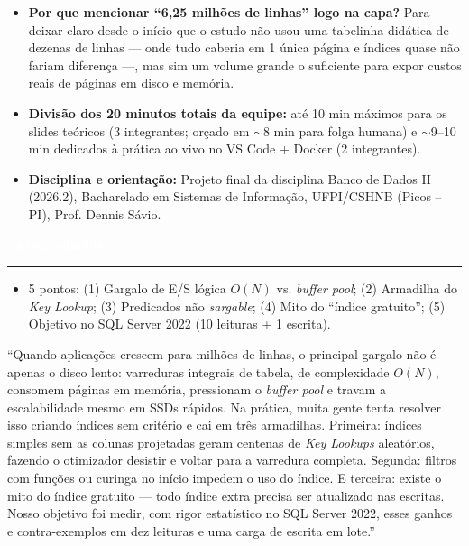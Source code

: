 \documentclass[10pt,a4paper]{article}
\newcommand{\tagTime}[1]{\colorbox{BrandDark}{\textcolor{white}{\textbf{\footnotesize\ #1\ }}}}
\newcommand{\slideHeader}[3]{%
  \noindent{\Large\bfseries\color{BrandDark} Slide #1 — #2}\hfill\tagTime{Alvo: #3}\par
  \vspace{2pt}\noindent\textcolor{BrandAmber}{\rule{\linewidth}{1.3pt}}\par
  \vspace{4pt}
}
\begin{document}
\begin{expBox}
  \begin{itemize}[leftmargin=14pt,itemsep=2pt,topsep=1pt]
    \item \textbf{Por que mencionar ``6,25 milhões de linhas'' logo na capa?} Para deixar claro desde o início que o estudo não usou uma tabelinha didática de dezenas de linhas — onde tudo caberia em 1 única página e índices quase não fariam diferença —, mas sim um volume grande o suficiente para expor custos reais de páginas em disco e memória.
    \item \textbf{Divisão dos 20 minutos totais da equipe:} até 10 min máximos para os slides teóricos (3 integrantes; orçado em $\sim$8 min para folga humana) e $\sim$9--10 min dedicados à prática ao vivo no VS Code + Docker (2 integrantes).
    \item \textbf{Disciplina e orientação:} Projeto final da disciplina Banco de Dados II (2026.2), Bacharelado em Sistemas de Informação, UFPI/CSHNB (Picos -- PI), Prof. Dennis Sávio.
  \end{itemize}
\end{expBox}

\clearpage

\slideHeader{2}{Contexto e Problema}{$\sim$0m50s}

\begin{telaBox}
  \begin{itemize}[leftmargin=14pt,itemsep=1pt,topsep=1pt]
    \item 5 pontos: (1) Gargalo de E/S lógica $O(N)$ vs. \emph{buffer pool}; (2) Armadilha do \emph{Key Lookup}; (3) Predicados não \emph{sargable}; (4) Mito do ``índice gratuito''; (5) Objetivo no SQL Server 2022 (10 leituras + 1 escrita).
  \end{itemize}
\end{telaBox}

\begin{falaBox}
``Quando aplicações crescem para milhões de linhas, o principal gargalo não é apenas o disco lento: varreduras integrais de tabela, de complexidade $O(N)$, consomem páginas em memória, pressionam o \emph{buffer pool} e travam a escalabilidade mesmo em SSDs rápidos. Na prática, muita gente tenta resolver isso criando índices sem critério e cai em três armadilhas. Primeira: índices simples sem as colunas projetadas geram centenas de \emph{Key Lookups} aleatórios, fazendo o otimizador desistir e voltar para a varredura completa. Segunda: filtros com funções ou curinga no início impedem o uso do índice. E terceira: existe o mito do índice gratuito — todo índice extra precisa ser atualizado nas escritas. Nosso objetivo foi medir, com rigor estatístico no SQL Server 2022, esses ganhos e contra-exemplos em dez leituras e uma carga de escrita em lote.''
\end{falaBox}
\end{document}
